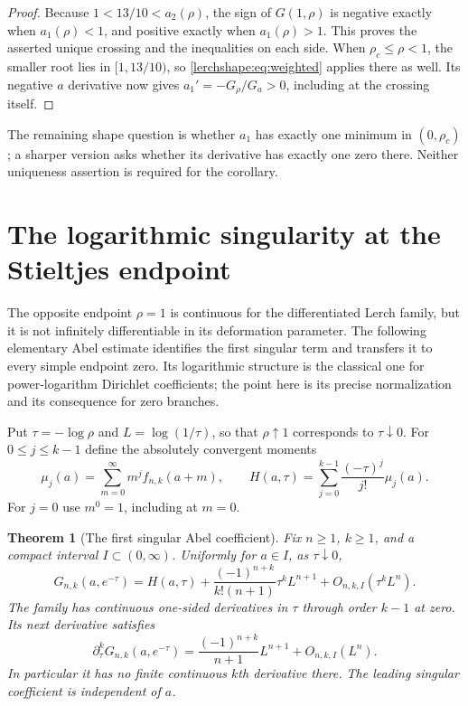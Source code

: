 \documentclass[11pt,a4paper]{article}
\newtheorem{theorem}{Theorem}[section]
\theoremstyle{definition}
\theoremstyle{remark}
\numberwithin{equation}{section}
\begin{document}
\begin{proof}
Because $1<13/10<a_2(\rho)$, the sign of $G(1,\rho)$ is negative
exactly when $a_1(\rho)<1$, and positive exactly when $a_1(\rho)>1$.
This proves the asserted unique crossing and the inequalities on
each side. When $\rho_c\leq\rho<1$, the smaller root lies in
$[1,13/10)$, so \eqref{lerchshape:eq:weighted} applies there as well.
Its negative $a$ derivative now gives $a_1'=-G_\rho/G_a>0$,
including at the crossing itself.
\end{proof}

The remaining shape question is whether $a_1$ has exactly one minimum
in $(0,\rho_c)$; a sharper version asks whether its derivative has
exactly one zero there. Neither uniqueness assertion is required for
the corollary.

\section{The logarithmic singularity at the Stieltjes endpoint}
\label{lerchboundary:sec:abel}

The opposite endpoint $\rho=1$ is continuous for the differentiated
Lerch family, but it is not infinitely differentiable in its deformation
parameter.  The following elementary Abel estimate identifies the first
singular term and transfers it to every simple endpoint zero.  Its
logarithmic structure is the classical one for power-logarithm
Dirichlet coefficients; the point here is its precise normalization
and its consequence for zero branches.

Put $\tau=-\log\rho$ and $L=\log(1/\tau)$, so that
$\rho\uparrow1$ corresponds to $\tau\downarrow0$.  For
$0\leq j\leq k-1$ define the absolutely convergent moments
\begin{equation}\label{lerchboundary:eq:moments}
 \mu_j(a)=\sum_{m=0}^{\infty}m^j f_{n,k}(a+m),
 \qquad
 H(a,\tau)=\sum_{j=0}^{k-1}\frac{(-\tau)^j}{j!}\mu_j(a).
\end{equation}
For $j=0$ use $m^0=1$, including at $m=0$.

\begin{theorem}[The first singular Abel coefficient]
\label{lerchboundary:thm:abel}
Fix $n\geq1$, $k\geq1$, and a compact interval $I\subset(0,\infty)$.
Uniformly for $a\in I$, as $\tau\downarrow0$,
\begin{equation}\label{lerchboundary:eq:abel}
 G_{n,k}(a,e^{-\tau})=H(a,\tau)
 +\frac{(-1)^{n+k}}{k!(n+1)}\tau^k L^{n+1}
 +O_{n,k,I}(\tau^k L^n).
\end{equation}
The family has continuous one-sided derivatives in $\tau$ through
order $k-1$ at zero. Its next derivative satisfies
\begin{equation}\label{lerchboundary:eq:abel-derivative}
 \partial_\tau^kG_{n,k}(a,e^{-\tau})
 =\frac{(-1)^{n+k}}{n+1}L^{n+1}+O_{n,k,I}(L^n).
\end{equation}
In particular it has no finite continuous $k$th derivative there.
The leading singular coefficient is independent of $a$.
\end{theorem}
\end{document}
